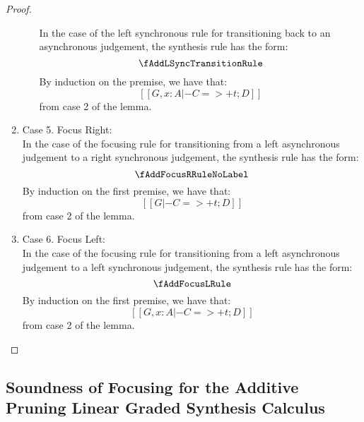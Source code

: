 \begin{proof}
\begin{enumerate}
\begin{enumerate}
          In the case of the left synchronous rule for transitioning back to an asynchronous judgement, the synthesis rule has the form:
          \[
            \fAddLSyncTransitionRule
          \]
          By induction on the premise, we have that:
          \[
            [[ G, x : A |- C =>+ t ; D ]] \tag{ih}
          \]
          from case 2 of the lemma.
      \end{enumerate}
    \item Case 5. Focus Right: \fAddFocusRName \\
          In the case of the focusing rule for transitioning from a left asynchronous judgement to a right synchronous judgement, the synthesis rule has the form:
          \[
            \fAddFocusRRuleNoLabel
          \]
          By induction on the first premise, we have that:
          \[
            [[ G |- C =>+ t ; D ]] \tag{ih}
          \]
          from case 2 of the lemma.
    \item Case 6. Focus Left: \fAddFocusLName \\
          In the case of the focusing rule for transitioning from a left asynchronous judgement to a left synchronous judgement, the synthesis rule has the form:
          \[
            \fAddFocusLRule
          \]
          By induction on the first premise, we have that:
          \[
            [[ G, x : A |- C =>+ t ; D ]] \tag{ih}
          \]
          from case 2 of the lemma.

  \end{enumerate}
\end{proof}

\subsection{Soundness of Focusing for the Additive Pruning Linear Graded Synthesis Calculus}
\label{proof:focusAddPruningSound}
\focusSoundAddPruning*

